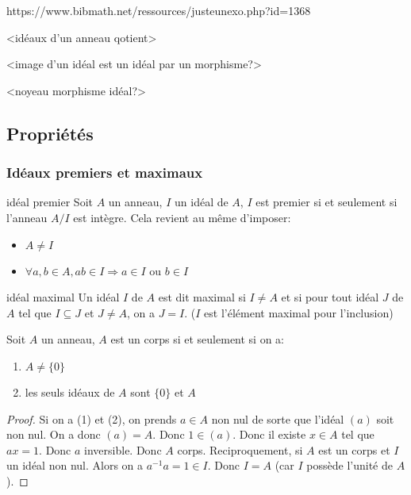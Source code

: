 https://www.bibmath.net/ressources/justeunexo.php?id=1368

<idéaux d'un anneau qotient>

<image d'un idéal est un idéal par un morphisme?>

<noyeau morphisme idéal?>



\subsection{Propriétés}

\subsubsection{Idéaux premiers et maximaux}

\begin{definition}{idéal premier}{}
    Soit $A$ un anneau, $I$ un idéal de $A$, $I$ est premier si et seulement si l'anneau $A/I$ est intègre.
    Cela revient au même d'imposer:
    \begin{itemize}
        \item $A \neq I$
        \item $\forall a, b \in A, ab \in I \Longrightarrow a \in I$ ou $ b \in I$
    \end{itemize}
\end{definition}

\begin{definition}{idéal maximal}{}
    Un idéal $I$ de $A$ est dit maximal si $I \neq A$ et si pour tout idéal $J$ de $A$ tel que $I \subseteq J$ et $J \neq A$, on a $J = I$.
    ($I$ est l'élément maximal pour l'inclusion)
\end{definition}

\begin{lemma}{}{}
    Soit $A$ un anneau, $A$ est un corps si et seulement si on a:
    \begin{enumerate}[(1)]
        \item $A \neq \{0\}$
        \item les seuls idéaux de $A$ sont $\{0\}$ et $A$
    \end{enumerate}
\end{lemma}

\begin{proof}
    Si on a (1) et (2), on prends $a \in A$ non nul de sorte que l'idéal $(a)$
    soit non nul. On a donc $(a) = A$. Donc $1 \in (a)$. Donc il existe $x \in A$
    tel que $ax = 1$. Donc $a$ inversible. Donc $A$ corps. \newline
    Reciproquement, si $A$ est un corps et $I$ un idéal non nul. Alors on a $a^{-1}a = 1 \in I$.
    Donc $I = A$ (car $I$ possède l'unité de $A$).
\end{proof}

